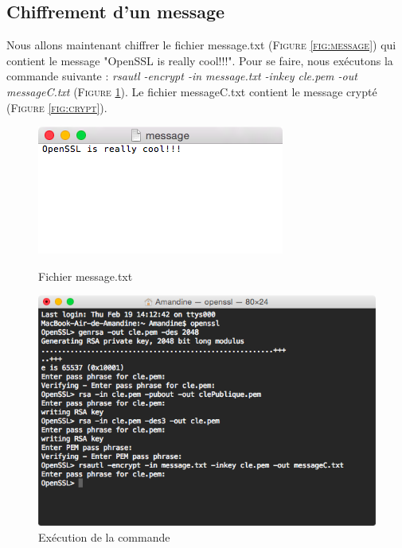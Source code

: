 \documentclass[11pt]{article}
\begin{document}
\subsection{Chiffrement d'un message}
Nous allons maintenant chiffrer le fichier message.txt (\textsc{Figure \ref{fig:message}}) qui contient le message "OpenSSL is really cool!!!". Pour se faire, nous exécutons la commande suivante : \textit{rsautl -encrypt -in message.txt -inkey cle.pem -out messageC.txt} (\textsc{Figure \ref{fig:cde3}}). Le fichier messageC.txt contient le message crypté (\textsc{Figure \ref{fig:crypt}}).
\begin{figure}[hbtp]
    \begin{minipage}[b]{0.4\linewidth}
        \centering \includegraphics[scale=0.4]{Capture/question4.png}
        \caption{Fichier message.txt}
                \label{fig:message}
\label{fig:base}
    \end{minipage}\hfill
    \begin{minipage}[b]{0.48\linewidth}
        \centering \includegraphics[scale=0.4]{Capture/question4b.png}
        \caption{Exécution de la commande}
         \label{fig:cde3}
    \end{minipage}
\end{figure}
\end{document}
